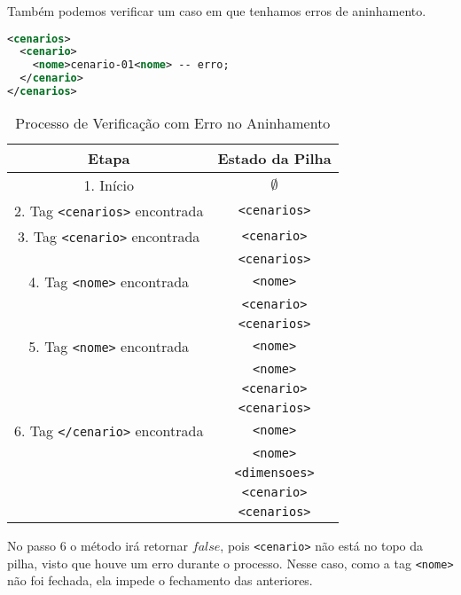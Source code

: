 Também podemos verificar um caso em que tenhamos erros de aninhamento. 

\begin{lstlisting}[language=XML]
<cenarios>
  <cenario>
    <nome>cenario-01<nome> -- erro;
  </cenario>
</cenarios>
\end{lstlisting}

\begin{table}[h!]
\centering
\begin{tabular}{|c|c|}
\hline
\textbf{Etapa} & \textbf{Estado da Pilha} \\
\hline
1. Início & \(\emptyset\) \\
\hline
2. Tag \texttt{<cenarios>} encontrada & \texttt{<cenarios>} \\
\hline
3. Tag \texttt{<cenario>} encontrada & \texttt{<cenario>} \\
                                      & \texttt{<cenarios>} \\
\hline
4. Tag \texttt{<nome>} encontrada & \texttt{<nome>} \\
                                        & \texttt{<cenario>} \\
                                        & \texttt{<cenarios>} \\
\hline
5. Tag \texttt{<nome>} encontrada & \texttt{<nome>} \\
                                     & \texttt{<nome>} \\
                                     & \texttt{<cenario>} \\
                                     & \texttt{<cenarios>} \\
\hline
6. Tag \texttt{</cenario>} encontrada & \texttt{<nome>} \\
                                     & \texttt{<nome>} \\
                                     & \texttt{<dimensoes>} \\
                                     & \texttt{<cenario>} \\
                                     & \texttt{<cenarios>} \\
\hline
\end{tabular}
\caption{Processo de Verificação com Erro no Aninhamento}
\end{table}

No passo 6 o método irá retornar $false$, pois \texttt{<cenario>} não está no topo da pilha, visto que houve um erro durante o processo. Nesse caso, como a tag \texttt{<nome>} não foi fechada, ela impede o fechamento das anteriores.


